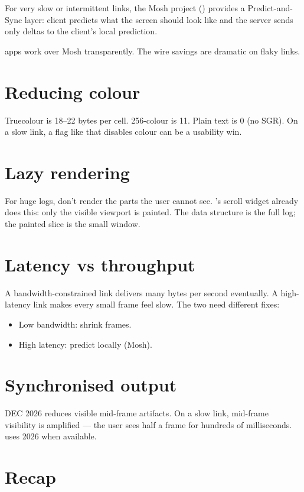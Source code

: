 For very slow or intermittent links, the Mosh project
() provides a Predict-and-Sync layer: client
predicts what the screen should look like and the server
sends only deltas to the client's local prediction.

\maya{} apps work over Mosh transparently. The wire savings
are dramatic on flaky links.

\section{Reducing colour}

Truecolour is 18--22 bytes per cell. 256-colour is 11. Plain
text is 0 (no SGR). On a slow link, a flag like
 that disables colour can be a usability win.

\section{Lazy rendering}

For huge logs, don't render the parts the user cannot see.
\maya{}'s scroll widget already does this: only the visible
viewport is painted. The data structure is the full log;
the painted slice is the small window.

\section{Latency vs throughput}

A bandwidth-constrained link delivers many bytes per second
eventually. A high-latency link makes every small frame feel
slow. The two need different fixes:

\begin{itemize}[leftmargin=*]
  \item Low bandwidth: shrink frames.
  \item High latency: predict locally (Mosh).
\end{itemize}

\section{Synchronised output}

DEC 2026 reduces visible mid-frame artifacts. On a slow
link, mid-frame visibility is amplified --- the user sees
half a frame for hundreds of milliseconds. \maya{} uses
2026 when available.

\section{Recap}

